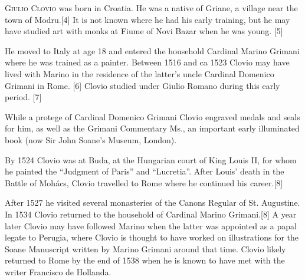 \begin{greco}

\noindent \lettrine{G}{iulio Clovio} was born in Croatia. He was a native of Griane, a village near the town of Modru.[4] It is not known where he had his early training, but he may have studied art with monks at Fiume of Novi Bazar when he was young. [5]

He moved to Italy at age 18 and entered the household Cardinal Marino Grimani where he was trained as a painter. Between 1516 and ca 1523 Clovio may have lived with Marino in the residence of the latter’s uncle Cardinal Domenico Grimani in Rome. [6] Clovio studied under Giulio Romano during this early period. [7]

While a protege of Cardinal Domenico Grimani Clovio engraved medals and seals for him, as well as the Grimani Commentary Ms., an important early illuminated book (now Sir John Soane's Museum, London).

By 1524 Clovio was at Buda, at the Hungarian court of King Louis II, for whom he painted the ``Judgment of Paris'' and ``Lucretia''. After Louis' death in the Battle of Mohács, Clovio travelled to Rome where he continued his career.[8]

After 1527 he visited several monasteries of the Canons Regular of St. Augustine. In 1534 Clovio returned to the household of Cardinal Marino Grimani.[8] A year later Clovio may have followed Marino when the latter was appointed as a papal legate to Perugia, where Clovio is thought to have worked on illustrations for the Soane Manuscript written by Marino Grimani around that time. Clovio likely returned to Rome by the end of 1538 when he is known to have met with the writer Francisco de Hollanda.

\end{greco}
\clearpage


